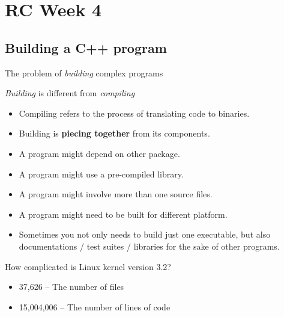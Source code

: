 \section{RC Week 4}
\subsection{Building a C++ program}
\begin{frame}{The problem of \textit{building} complex programs}
\vspace{-0.10in}
\begin{block}{\textit{Building} is different from \textit{compiling}}
	\vspace{-0.07in}
	\begin{itemize}
		\item Compiling refers to the process of translating code to binaries.
		\item Building is \textbf{piecing together} from its components.
		\item A program might depend on other package.
		\item A program might use a pre-compiled library.
		\item A program might involve more than one source files.
		\item A program might need to be built for different platform.
		\item Sometimes you not only needs to build just one executable, but also documentations / test suites / libraries for the sake of other programs.
	\end{itemize}
\end{block}
\vspace{-0.15in}
\begin{block}{How complicated is Linux kernel version 3.2?}
	\vspace{-0.07in}
	\begin{itemize}
		\item 37,626 – The number of files 
		\item 15,004,006 – The number of lines of code 
	\end{itemize}
\end{block}
\end{frame}

